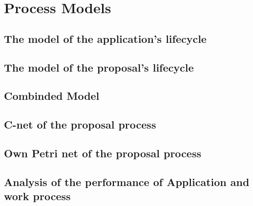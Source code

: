 \section*{Process Models}

\subsection*{The model of the application's lifecycle}

\subsection*{The model of the proposal's lifecycle }

\subsection*{Combinded Model}

\subsection*{C-net of the proposal process}

\subsection*{Own Petri net of the proposal process}

\subsection*{Analysis of the performance of Application and work process}
